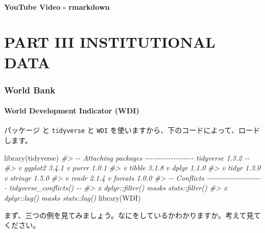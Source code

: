 \documentclass[
]{bxjsbook}
\newenvironment{Shaded}{\begin{snugshade}}{\end{snugshade}}
\newcommand{\CommentTok}[1]{\textcolor[rgb]{0.56,0.35,0.01}{\textit{#1}}}
\newcommand{\FunctionTok}[1]{\textcolor[rgb]{0.00,0.00,0.00}{#1}}
\newcommand{\NormalTok}[1]{#1}
\theoremstyle{definition}
\theoremstyle{definition}
\theoremstyle{definition}
\theoremstyle{definition}
\theoremstyle{remark}
\begin{document}
\hypertarget{youtube-video---rmarkdown}{%
\subsection{YouTube Video - rmarkdown}\label{youtube-video---rmarkdown}}

\hypertarget{part-part-iii-institutional-data}{%
\part{PART III INSTITUTIONAL DATA}\label{part-part-iii-institutional-data}}

\hypertarget{worldbank}{%
\section{World Bank}\label{worldbank}}

\hypertarget{world-development-indicator-wdi}{%
\subsection{World Development Indicator (WDI)}\label{world-development-indicator-wdi}}

パッケージ と \texttt{tidyverse} と \texttt{WDI} を使いますから、下のコードによって、ロードします。

\begin{Shaded}
\begin{Highlighting}[]
\FunctionTok{library}\NormalTok{(tidyverse)}
\CommentTok{\#\textgreater{} {-}{-} Attaching packages {-}{-}{-}{-}{-}{-}{-}{-}{-}{-}{-}{-}{-}{-}{-}{-}{-}{-}{-} tidyverse 1.3.2 {-}{-}}
\CommentTok{\#\textgreater{} v ggplot2 3.4.1     v purrr   1.0.1}
\CommentTok{\#\textgreater{} v tibble  3.1.8     v dplyr   1.1.0}
\CommentTok{\#\textgreater{} v tidyr   1.3.0     v stringr 1.5.0}
\CommentTok{\#\textgreater{} v readr   2.1.4     v forcats 1.0.0}
\CommentTok{\#\textgreater{} {-}{-} Conflicts {-}{-}{-}{-}{-}{-}{-}{-}{-}{-}{-}{-}{-}{-}{-}{-}{-}{-}{-}{-}{-}{-} tidyverse\_conflicts() {-}{-}}
\CommentTok{\#\textgreater{} x dplyr::filter() masks stats::filter()}
\CommentTok{\#\textgreater{} x dplyr::lag()    masks stats::lag()}
\FunctionTok{library}\NormalTok{(WDI)}
\end{Highlighting}
\end{Shaded}

まず、三つの例を見てみましょう。なにをしているかわかりますか。考えて見てください。
\end{document}
